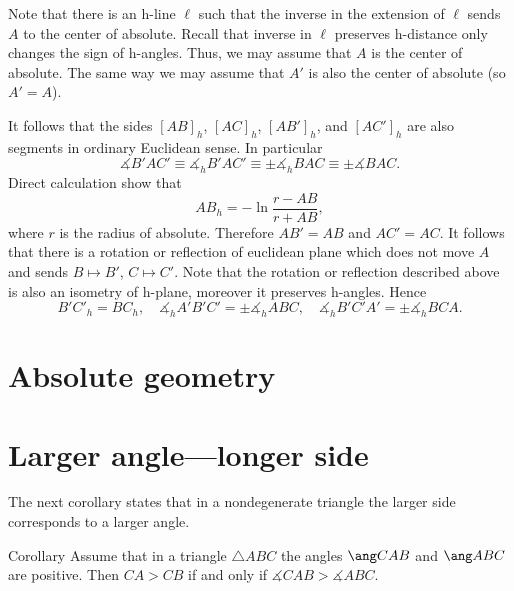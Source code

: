 {
Note that there is an h-line $\ell$ such that the inverse in the extension of $\ell$ sends $A$ to the center of absolute.
Recall that inverse in $\ell$ preserves h-distance only changes the sign of h-angles.%
Thus, we may assume that $A$ is the center of absolute.
The same way we may assume that $A'$ is also the center of absolute (so $A'=A$).

It follows that the sides $[AB]_h$, $[AC]_h$, $[AB']_h$, and $[AC']_h$ are also segments in ordinary Euclidean sense.
In particular 
$$\measuredangle B'AC'\equiv\measuredangle_h B'AC'\equiv\pm\measuredangle_h BAC\equiv\pm\measuredangle BAC.$$
Direct calculation show that 
$$AB_h=-\ln\frac{r-AB}{r+AB},$$
where $r$ is the radius of absolute.
Therefore $A B'=AB$ and $A C'=AC$.
It follows that there is a rotation or reflection of euclidean plane which does not move $A$ and sends $B\mapsto B'$, $C\mapsto C'$.
Note that the rotation or reflection described above is also an isometry of h-plane,
moreover it preserves h-angles.
Hence   
$$ B' C'_h= B C_h,
\quad
\measuredangle_h A' B' C'
=
\pm\measuredangle_h A B C,
\quad
\measuredangle_h B' C' A'
=
\pm\measuredangle_h B  C A.
$$
\qedsf













\section{Absolute geometry}






 


\section*{Larger angle---longer side}

The next corollary states that in a nondegenerate triangle 
the larger side corresponds to a larger angle.

\begin{thm}{Corollary}\label{cor:larger-side=>larger-angle}
Assume that in a triangle $\triangle ABC$ the angles $\ang CAB$ and $\ang ABC$ are positive.
Then 
$CA>CB$ if and only if $\measuredangle CAB>\measuredangle ABC$.
\end{thm}

}
